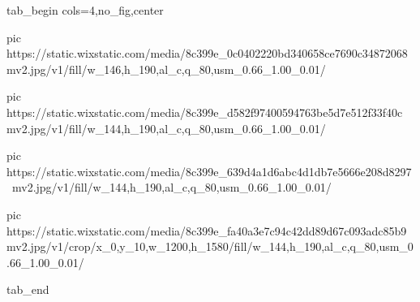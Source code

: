  
 
 
 
 

\ifcmt
  tab_begin cols=4,no_fig,center

     pic https://static.wixstatic.com/media/8c399e_0c0402220bd340658ce7690c34872068~mv2.jpg/v1/fill/w_146,h_190,al_c,q_80,usm_0.66_1.00_0.01/%

		 pic https://static.wixstatic.com/media/8c399e_d582f97400594763be5d7e512f33f40c~mv2.jpg/v1/fill/w_144,h_190,al_c,q_80,usm_0.66_1.00_0.01/%

		 pic https://static.wixstatic.com/media/8c399e_639d4a1d6abc4d1db7e5666e208d8297~mv2.jpg/v1/fill/w_144,h_190,al_c,q_80,usm_0.66_1.00_0.01/%

		 pic https://static.wixstatic.com/media/8c399e_fa40a3e7c94c42dd89d67c093adc85b9~mv2.jpg/v1/crop/x_0,y_10,w_1200,h_1580/fill/w_144,h_190,al_c,q_80,usm_0.66_1.00_0.01/%

  tab_end
\fi
